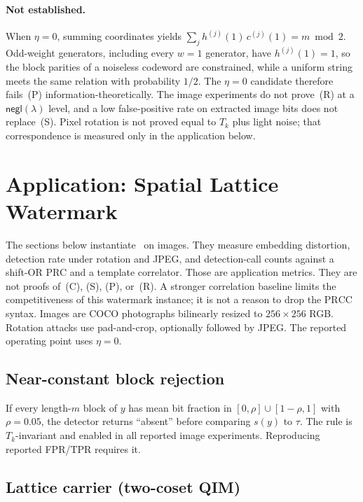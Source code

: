 \documentclass[11pt,a4paper]{article}
\newcommand{\negl}{\mathsf{negl}}
\newcommand{\PRCC}{\ensuremath{\mathrm{PRCC}}}
\begin{document}
\paragraph{Not established.}
When \(\eta=0\), summing coordinates yields
\(\sum_j h^{(j)}(1)\,c^{(j)}(1)=m\bmod 2\).
Odd-weight generators, including every \(w=1\) generator, have \(h^{(j)}(1)=1\), so
the block parities of a noiseless codeword are constrained, while a uniform string
meets the same relation with probability \(1/2\).
The \(\eta=0\) candidate therefore fails~(P) information-theoretically.
The image experiments do not prove~(R) at a \(\negl(\lambda)\) level, and a low
false-positive rate on extracted image bits does not replace~(S).
Pixel rotation is not proved equal to \(T_k\) plus light noise; that correspondence
is measured only in the application below.

\section{Application: Spatial Lattice Watermark}
\label{sec:app}

The sections below instantiate~ on images.
They measure embedding distortion, detection rate under rotation and JPEG, and
detection-call counts against a shift-OR PRC and a template correlator.
Those are application metrics.
They are not proofs of~(C), (S), (P), or~(R).
A stronger correlation baseline limits the competitiveness of this watermark
instance; it is not a reason to drop the \PRCC{} syntax.
Images are COCO photographs bilinearly resized to \(256\times256\) RGB.
Rotation attacks use pad-and-crop, optionally followed by JPEG.
The reported operating point uses \(\eta=0\).

\subsection{Near-constant block rejection}
\label{sec:const}

If every length-\(m\) block of \(y\) has mean bit fraction in
\([0,\rho]\cup[1-\rho,1]\) with \(\rho=0.05\), the detector returns ``absent''
before comparing \(s(y)\) to \(\tau\).
The rule is \(T_k\)-invariant and enabled in all reported image experiments.
Reproducing reported FPR/TPR requires it.

\subsection{Lattice carrier (two-coset QIM)}
\label{sec:lattice}
\end{document}
